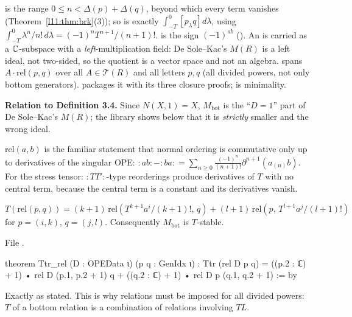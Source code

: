 \begin{dictionary}
\allowbreak{}\allowbreak{}\allowbreak{} is the range $0\le n<\Delta(p)+\Delta(q)$, beyond which every term vanishes
(Theorem~\ref{l11:thm:brk}(3)); so  is exactly $\int_{-T}^0[p_\lambda q]d\lambda$, using
$\int_{-T}^0\lambda^n/n!\,d\lambda = (-1)^nT^{n+1}/(n+1)!$.  is the sign $(-1)^{ab}$
(). An  is carried as a ${\mathbb{C}}$-subspace with a
\emph{left}-multiplication field: De Sole--Kac's $M(R)$ is a left ideal, not two-sided, so the quotient is a vector space and
not an algebra.  spans $A\cdot\mathrm{rel}(p,q)$ over all $A\in\mathcal T(R)$ and all letters $p,q$ (all divided
powers, not only bottom generators).  packages it with its three closure proofs;  is minimality.

\textbf{Relation to Definition 3.4.} Since $N(X,1) = X$, $M_{\mathrm{bot}}$ is the ``$D=1$'' part of De Sole--Kac's $M(R)$; the
library shows below that it is \emph{strictly} smaller and the wrong ideal.
\end{dictionary}

\begin{physics}
$\mathrm{rel}(a,b)$ is the familiar statement that normal ordering is commutative only up to derivatives of the singular OPE:
${:}ab{:}-{:}ba{:} = \sum_{n\ge0}\frac{(-1)^n}{(n+1)!}\partial^{n+1}(a_{(n)}b)$. For the stress tensor:
${:}TT'{:}$-type reorderings produce derivatives of $T$ with no central term, because the central term is a constant and its
derivatives vanish.
\end{physics}

\begin{theorem}\label{l11:thm:Trel}
$T(\mathrm{rel}(p,q)) = (k+1)\,\mathrm{rel}(T^{k+1}a^i/(k+1)!,\,q)+(l+1)\,\mathrm{rel}(p,\,T^{l+1}a^j/(l+1)!)$ for $p = (i,k)$,
$q = (j,l)$. Consequently $M_{\mathrm{bot}}$ is $T$-stable.
\end{theorem}
\noindent File .
\begin{leancode}
theorem Ttr_rel (D : OPEData ι) (p q : GenIdx ι) :
    Ttr (rel D p q)
      = ((p.2 : ℂ) + 1) • rel D (p.1, p.2 + 1) q
        + ((q.2 : ℂ) + 1) • rel D p (q.1, q.2 + 1) := by
\end{leancode}

\begin{dictionary}
Exactly as stated. This is why relations must be imposed for all divided powers: $T$ of a bottom relation is a combination of
relations involving $TL$.
\end{dictionary}

